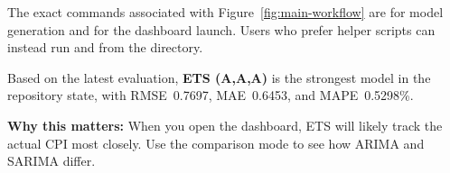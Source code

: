 The exact commands associated with Figure~\ref{fig:main-workflow} are  for model generation and  for the dashboard launch. Users who prefer helper scripts can instead run  and  from the  directory.

\begin{tcolorbox}[colback=teal!5!white, colframe=teal!75!black, title=Current Best Model]
Based on the latest evaluation, \textbf{ETS (A,A,A)} is the strongest model in the repository state, with RMSE~0.7697, MAE~0.6453, and MAPE~0.5298\%.

\textbf{Why this matters:} When you open the dashboard, ETS will likely track the actual CPI most closely. Use the comparison mode to see how ARIMA and SARIMA differ.
\end{tcolorbox}

